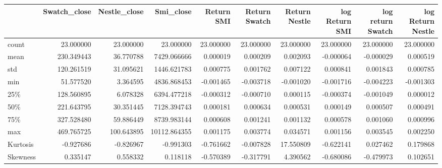 \begin{tabular}{lrrrrrrrrr}
\toprule
{} &  Swatch\_close &  Nestle\_close &     Smi\_close &  Return SMI &  Return Swatch &  Return Nestle &  log Return SMI &  log return Swatch &  log Return Nestle \\
\midrule
count    &     23.000000 &     23.000000 &     23.000000 &   23.000000 &      23.000000 &      23.000000 &       23.000000 &          23.000000 &          23.000000 \\
mean     &    230.349443 &     36.770788 &   7429.066666 &    0.000019 &       0.000209 &       0.002093 &       -0.000064 &          -0.000029 &           0.000519 \\
std      &    120.261519 &     31.095621 &   1446.621783 &    0.000775 &       0.001762 &       0.007122 &        0.000841 &           0.001843 &           0.000785 \\
min      &     51.577520 &      3.364595 &   4836.868453 &   -0.001465 &      -0.003718 &      -0.001020 &       -0.001716 &          -0.004223 &          -0.001303 \\
25\%      &    128.560895 &      6.078328 &   6394.477218 &   -0.000312 &      -0.000710 &       0.000115 &       -0.000374 &          -0.001049 &           0.000012 \\
50\%      &    221.643795 &     30.351445 &   7128.394743 &    0.000181 &       0.000634 &       0.000531 &        0.000149 &           0.000507 &           0.000491 \\
75\%      &    327.528480 &     59.886449 &   8739.983144 &    0.000608 &       0.001241 &       0.001132 &        0.000578 &           0.001060 &           0.000996 \\
max      &    469.765725 &    100.643895 &  10112.864355 &    0.001175 &       0.003774 &       0.034571 &        0.001156 &           0.003545 &           0.002250 \\
Kurtosis &     -0.927686 &     -0.826967 &     -0.991303 &   -0.761662 &      -0.007828 &      17.550809 &       -0.622141 &           0.027462 &           0.179868 \\
Skewness &      0.335147 &      0.558332 &      0.118118 &   -0.570389 &      -0.317791 &       4.390562 &       -0.680086 &          -0.479973 &           0.102651 \\
\bottomrule
\end{tabular}
